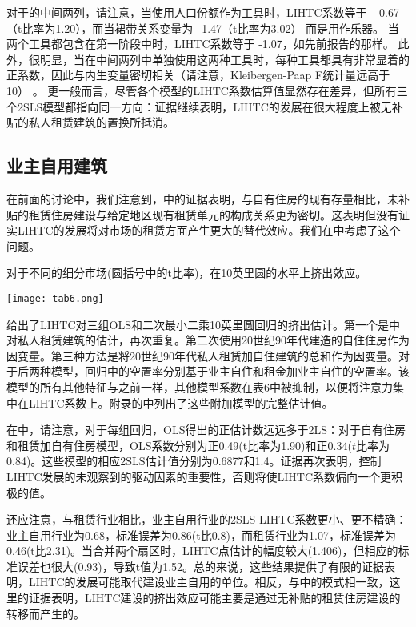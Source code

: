 \documentclass[lang=cn,11pt,a4paper]{paper}
\begin{document}
对于的中间两列，请注意，当使用人口份额作为工具时，LIHTC系数等于 −0.67（t比率为1.20），而当裙带关系变量为−1.47（t比率为3.02） 而是用作乐器。 当两个工具都包含在第一阶段中时，LIHTC系数等于 -1.07，如先前报告的那样。 此外，很明显，当在中间两列中单独使用这两种工具时，每种工具都具有非常显着的正系数，因此与内生变量密切相关（请注意，Kleibergen-Paap F统计量远高于10） 。 更一般而言，尽管各个模型的LIHTC系数估算值显然存在差异，但所有三个2SLS模型都指向同一方向：证据继续表明，LIHTC的发展在很大程度上被无补贴的私人租赁建筑的置换所抵消。

\subsection{业主自用建筑}

在前面的讨论中，我们注意到，中的证据表明，与自有住房的现有存量相比，未补贴的租赁住房建设与给定地区现有租赁单元的构成关系更为密切。这表明但没有证实LIHTC的发展将对市场的租赁方面产生更大的替代效应。我们在中考虑了这个问题。

\begin{table}[h]
  \caption{对于不同的细分市场(圆括号中的t比率)，在10英里圆的水平上挤出效应。}\label{tab6}
  \texttt{[image: tab6.png]}
\noindent{}
\end{table}

给出了LIHTC对三组OLS和二次最小二乘10英里圆回归的挤出估计。第一个是中对私人租赁建筑的估计，再次重复。第二次使用20世纪90年代建造的自住住房作为因变量。第三种方法是将20世纪90年代私人租赁加自住建筑的总和作为因变量。对于后两种模型，回归中的空置率分别基于业主自住和租金加业主自住的空置率。该模型的所有其他特征与之前一样，其他模型系数在表6中被抑制，以便将注意力集中在LIHTC系数上。附录的中列出了这些附加模型的完整估计值。

在中，请注意，对于每组回归，OLS得出的正估计数远远多于2LS：对于自有住房和租赁加自有住房模型，OLS系数分别为正0.49(t比率为1.90)和正0.34($t$比率为0.84)。这些模型的相应2SLS估计值分别为0.6877和1.4。证据再次表明，控制LIHTC发展的未观察到的驱动因素的重要性，否则将使LIHTC系数偏向一个更积极的值。

还应注意，与租赁行业相比，业主自用行业的2SLS LIHTC系数更小、更不精确：业主自用行业为0.68，标准误差为0.86(t比0.8)，而租赁行业为1.07，标准误差为0.46(t比2.31)。当合并两个扇区时，LIHTC点估计的幅度较大(1.406)，但相应的标准误差也很大(0.93)，导致t值为1.52。总的来说，这些结果提供了有限的证据表明，LIHTC的发展可能取代建设业主自用的单位。相反，与中的模式相一致，这里的证据表明，LIHTC建设的挤出效应可能主要是通过无补贴的租赁住房建设的转移而产生的。
\end{document}
